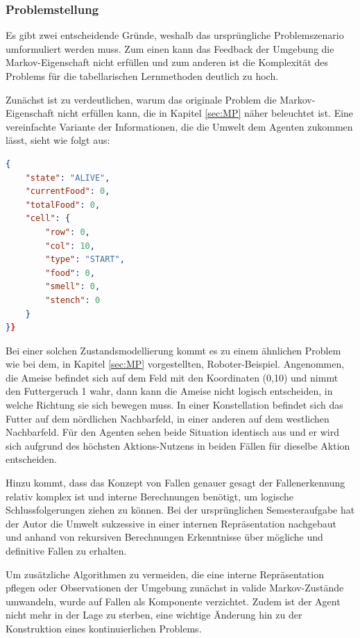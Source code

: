 \subsubsection{Problemstellung}
Es gibt zwei entscheidende Gründe, weshalb das ursprüngliche Problemszenario umformuliert werden muss. Zum einen kann das Feedback der Umgebung die Markov-Eigenschaft nicht erfüllen und zum anderen ist die Komplexität des Problems für die tabellarischen Lernmethoden deutlich zu hoch.
\par
Zunächst ist zu verdeutlichen, warum das originale Problem die Markov-Eigenschaft nicht erfüllen kann, die in Kapitel \ref{sec:MP} näher beleuchtet ist. Eine vereinfachte Variante der Informationen, die die Umwelt dem Agenten zukommen lässt, sieht wie folgt aus:
\begin{lstlisting}[language=json,firstnumber=1, label=lst:ursprüngliche Wahrnehmung,caption=bar]
{
    "state": "ALIVE",
    "currentFood": 0,
    "totalFood": 0,
    "cell": {
        "row": 0,
        "col": 10,
        "type": "START",
        "food": 0,
        "smell": 0,
        "stench": 0
    }
}}
\end{lstlisting}
Bei einer solchen Zustandsmodellierung kommt es zu einem ähnlichen Problem wie bei dem, in Kapitel \ref{sec:MP} vorgestellten, Roboter-Beispiel. Angenommen, die Ameise befindet sich auf dem Feld mit den Koordinaten (0,10) und nimmt den Futtergeruch 1 wahr, dann kann die Ameise nicht logisch entscheiden, in welche Richtung sie sich bewegen muss. In einer Konstellation befindet sich das Futter auf dem nördlichen Nachbarfeld, in einer anderen auf dem westlichen Nachbarfeld. Für den Agenten sehen beide Situation identisch aus und er wird sich aufgrund des höchsten Aktions-Nutzens in beiden Fällen für dieselbe Aktion entscheiden.
\par 
Hinzu kommt, dass das Konzept von Fallen genauer gesagt der Fallenerkennung relativ komplex ist und interne Berechnungen benötigt, um logische Schlussfolgerungen ziehen zu können. Bei der ursprünglichen Semesteraufgabe hat der Autor die Umwelt sukzessive in einer internen Repräsentation nachgebaut und anhand von rekursiven Berechnungen Erkenntnisse über mögliche und definitive Fallen zu erhalten.
\par 
Um zusätzliche Algorithmen zu vermeiden, die eine interne Repräsentation pflegen oder Observationen der Umgebung zunächst in valide Markov-Zustände umwandeln, wurde  
auf Fallen als Komponente verzichtet. Zudem ist der Agent nicht mehr in der Lage zu sterben, eine wichtige Änderung hin zu der Konstruktion eines kontinuierlichen Problems.   
